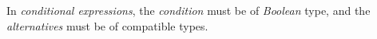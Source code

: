 In \emph{conditional expressions},
the \emph{condition} must be of \emph{Boolean} type,
and the \emph{alternatives} must be of compatible types.
